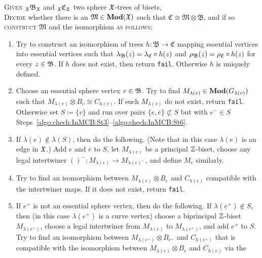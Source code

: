 \documentclass{amsart}
\begin{document}
\begin{algo}\label{algo:chech:InMCB:pre}
  \textsc{Given} ${}_{\mathfrak X}\mathfrak B_{\mathfrak X}$ and ${}_{\mathfrak X}\mathfrak C_{\mathfrak X}$
  two sphere ${\mathfrak X}$-trees of bisets,\\
  \textsc{Decide} whether there is an  $\mathfrak M\in \mathbf{\relax Mod}({\mathfrak X})$ such that 
  $\mathfrak C\cong \mathfrak M \otimes \mathfrak B $, and if so
  \textsc{construct} $\mathfrak M$ and the isomorphism \textsc{as follows:}\\\upshape
  \begin{enumerate} 
  \item Try to construct an isomorphism of trees
    $h\colon \mathfrak B\to\mathfrak C$ mapping essential vertices
    into essential vertices such that
    $\lambda_{\mathfrak B} (z)=\lambda_{\mathfrak C} \circ h(z)$ and
    $\rho_{\mathfrak B}(z)=\rho_{\mathfrak C} \circ h(z)$ for every $z\in{\mathfrak B}$. If $h$
    does not exist, then return \texttt{fail}. Otherwise $h$ is
    uniquely defined.
  \item Choose an essential sphere vertex $v\in {\mathfrak B}$. Try to find
    $M_{\lambda(v)} \in \mathbf{\relax Mod}(G_{\lambda(v)})$ such that
    $M_{\lambda(v)} \otimes B_v \cong C_{h(v)}$. If such
    $M_{\lambda(v)}$ do not exist, return \texttt{fail}. Otherwise set
    $S\coloneqq \{v\}$ and run over pairs $\{e,\overline e\}\not\subset S$
    but with $e^- \in S$
    Steps~\ref{algo:chech:InMCB:St3}--\ref{algo:chech:InMCB:St6}.
  \item If $\lambda(e)\notin \lambda(S)$, then do the
    following. (Note that in this case $\lambda(e)$ is an edge in
    ${\mathfrak X}$.) Add $e$ and $\overline e$ to $S$, let $M_{\lambda(e)}$ be
    a principal ${\mathbb Z}$-biset, choose any legal intertwiner
    $()^-\colon M_{\lambda(e)}\to M_{\lambda(e)^-}$, and define
    $M_{\overline e}$ similarly.\label{algo:chech:InMCB:St3}
  \item Try to find an isomorphism between
    $M_{\lambda(e)}\otimes B_{e}$ and $C_{h(e)}$ compatible with the
    intertwiner maps. If it does not exist, return \texttt{fail}.
  \item If $e^+$ is not an essential sphere vertex, then do the
    following. If $\lambda(e^+)\notin S$, then (in this case
    $\lambda(e^+)$ is a curve vertex) choose a biprincipal ${\mathbb Z}$-biset
    $M_{\lambda(e^+)}$, choose a legal intertwiner from
    $M_{\lambda(e)}$ to $M_{{\lambda(e^+)}}$, and add $e^+$ to
    $S$. Try to find an isomorphism between
    $M_{\lambda(e^+)}\otimes B_{e^+}$ and $C_{h(e^+)}$ that is
    compatible with the isomorphism between
    $M_{\lambda(e)}\otimes B_{e}$ and $C_{h(e)}$ via the

\end{enumerate}
\end{algo}
\end{document}
